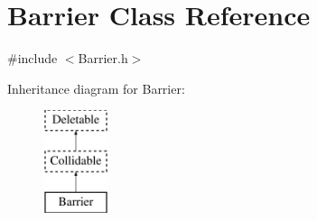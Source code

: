 \hypertarget{classBarrier}{\section{Barrier Class Reference}
\label{classBarrier}
}


{\ttfamily \#include $<$Barrier.\-h$>$}

Inheritance diagram for Barrier\-:\begin{figure}[H]
\begin{center}
\leavevmode
\includegraphics[height=3.000000cm]{classBarrier}
\end{center}
\end{figure}
